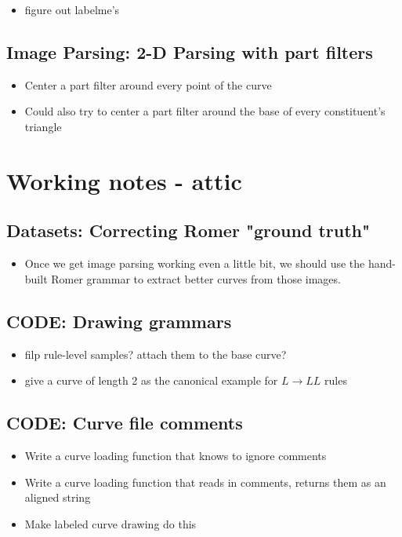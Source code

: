 \documentclass{book}
\begin{document}
\begin{itemize}
\item figure out labelme's
\end{itemize}
\section{Image Parsing: 2-D Parsing with part filters}
\label{sec-6_19}

\begin{itemize}
\item Center a part filter around every point of the curve
\item Could also try to center a part filter around the base of every
    constituent's triangle
\end{itemize}
\chapter{Working notes - attic}
\label{sec-7}
\section{Datasets: Correcting Romer "ground truth"}
\label{sec-7_1}

\begin{itemize}
\item Once we get image parsing working even a little bit, we should use
    the hand-built Romer grammar to extract better curves from those
    images.
\end{itemize}
\section{CODE: Drawing grammars}
\label{sec-7_2}

\begin{itemize}
\item filp rule-level samples? attach them to the base curve?
\item give a curve of length 2 as the canonical example for $L\to LL$
    rules
\end{itemize}
\section{CODE: Curve file comments}
\label{sec-7_3}

\begin{itemize}
\item Write a curve loading function that knows to ignore comments
\item Write a curve loading function that reads in comments, returns
    them as an aligned string
\item Make labeled curve drawing do this
\end{itemize}
\end{document}
